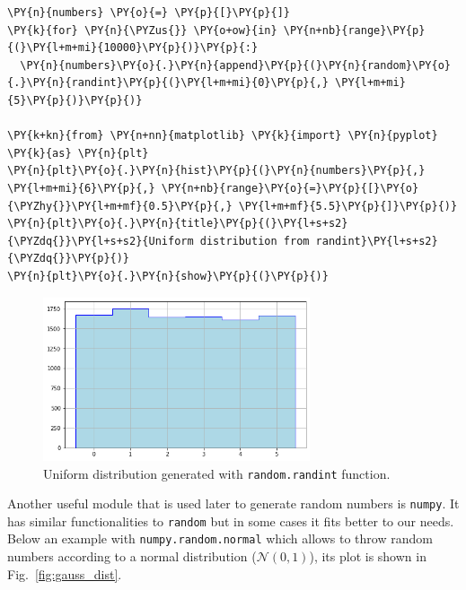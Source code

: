  \begin{codebox}[breakable, size=fbox, boxrule=1pt, pad at break*=1mm,colback=cellbackground, colframe=cellborder]
\begin{Verbatim}[commandchars=\\\{\}]
\PY{n}{numbers} \PY{o}{=} \PY{p}{[}\PY{p}{]}
\PY{k}{for} \PY{n}{\PYZus{}} \PY{o+ow}{in} \PY{n+nb}{range}\PY{p}{(}\PY{l+m+mi}{10000}\PY{p}{)}\PY{p}{:}
  \PY{n}{numbers}\PY{o}{.}\PY{n}{append}\PY{p}{(}\PY{n}{random}\PY{o}{.}\PY{n}{randint}\PY{p}{(}\PY{l+m+mi}{0}\PY{p}{,} \PY{l+m+mi}{5}\PY{p}{)}\PY{p}{)}

\PY{k+kn}{from} \PY{n+nn}{matplotlib} \PY{k}{import} \PY{n}{pyplot} \PY{k}{as} \PY{n}{plt}
\PY{n}{plt}\PY{o}{.}\PY{n}{hist}\PY{p}{(}\PY{n}{numbers}\PY{p}{,} \PY{l+m+mi}{6}\PY{p}{,} \PY{n+nb}{range}\PY{o}{=}\PY{p}{[}\PY{o}{\PYZhy{}}\PY{l+m+mf}{0.5}\PY{p}{,} \PY{l+m+mf}{5.5}\PY{p}{]}\PY{p}{)}
\PY{n}{plt}\PY{o}{.}\PY{n}{title}\PY{p}{(}\PY{l+s+s2}{\PYZdq{}}\PY{l+s+s2}{Uniform distribution from randint}\PY{l+s+s2}{\PYZdq{}}\PY{p}{)}
\PY{n}{plt}\PY{o}{.}\PY{n}{show}\PY{p}{(}\PY{p}{)}
\end{Verbatim}
\end{codebox}

\begin{figure}[h]
\centering
\includegraphics[width=0.7\textwidth]{figures/uniform.png}
\caption{Uniform distribution generated with \texttt{random.randint} function.}
\label{fig:uniform_dist}
\end{figure}
    
Another useful module that is used later to generate random numbers is \texttt{numpy}. It has similar functionalities to \texttt{random} but in some cases it fits better to our needs.    
Below an example with \texttt{numpy.random.normal} which allows to throw random numbers according to a normal distribution
(\(\mathcal{N}(0, 1)\)), its plot is shown in Fig.~\ref{fig:gauss_dist}.

